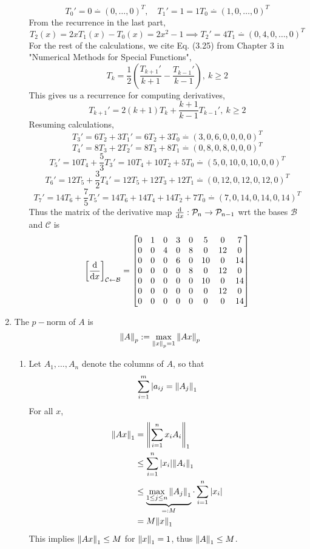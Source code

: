 \documentclass{article}
\def\mc#1{\mathcal{#1}}
\newcommand{\br}[1]{\left(#1\right)}
\newcommand{\sbr}[1]{\left[#1\right]}
\newcommand{\m}[2][b]{\begin{#1matrix}#2\end{#1matrix}}
\newcommand{\imp}{\implies}
\newcommand{\rep}{\overset{.}{=}}
\begin{document}
\begin{enumerate}
\begin{enumerate}
		\[T_0' = 0 \rep (0,\dots,0)^T,
		\quad T_1' = 1 = 1T_0 \rep (1,0,\dots,0)^T\]
		From the recurrence in the last part,
		\[T_2(x) = 2xT_1(x) - T_0(x) = 2x^2 - 1
		\imp T_2' = 4T_1 \rep (0,4,0,\dots,0)^T\]
		For the rest of the calculations, we cite Eq. (3.25) from Chapter 3 in "Numerical Methods for Special Functions",
		\[T_k = \frac12\br{\frac{T_{k+1}'}{k+1}-\frac{T_{k-1}'}{k-1}}, ~k\ge 2\]
		This gives us a recurrence for computing derivatives,
		\[T_{k+1}' = 2(k+1)T_k + \frac{k+1}{k-1}T_{k-1}', ~k\ge 2\]
		Resuming calculations,
		\[T_3' = 6T_2 + 3T_1' = 6T_2 + 3T_0 \rep (3,0,6,0,0,0,0)^T\]
		\[T_4' = 8T_3 + 2T_2' = 8T_3 + 8T_1 \rep (0,8,0,8,0,0,0)^T\]
		\[T_5' = 10T_4 + \frac53T_3' = 10T_4 + 10T_2 + 5T_0 \rep (5,0,10,0,10,0,0)^T\]
		\[T_6' = 12T_5 + \frac32T_4' = 12T_5 + 12T_3 + 12T_1 \rep (0,12,0,12,0,12,0)^T\]
		\[T_7' = 14T_6 + \frac75T_5' = 14T_6 + 14T_4 + 14T_2 + 7T_0 \rep (7,0,14,0,14,0,14)^T\]
		Thus the matrix of the derivative map $\dv{x}:\mc P_n\to\mc P_{n-1}$ wrt the bases $\mc B$ and $\mc C$ is
		\[\sbr{\dv{x}}_{\mc C\leftarrow\mc B} = 
		\m{
		0 & 1 & 0 & 3 & 0 & 5 & 0 & 7 \\
		0 & 0 & 4 & 0 & 8 & 0 & 12 & 0 \\
		0 & 0 & 0 & 6 & 0 & 10 & 0 & 14 \\
		0 & 0 & 0 & 0 & 8 & 0 & 12 & 0 \\
		0 & 0 & 0 & 0 & 0 & 10 & 0 & 14 \\
		0 & 0 & 0 & 0 & 0 & 0 & 12 & 0 \\
		0 & 0 & 0 & 0 & 0 & 0 & 0 & 14
		}\]
		
		
	\end{enumerate}



	\item The $p-$norm of $A$ is
	\[\norm{A}_p := \max_{\norm{x}_p=1}\norm{Ax}_p\]
	
	\begin{enumerate}
		
		
		
		\item Let $A_1,\dots,A_n$ denote the columns of $A$, so that
		\[\sum_{i=1}^m |a_{ij} = \norm{A_j}_1\]
		For all $x$,
		\begin{align*}
			\norm{Ax}_1 &= \norm{\sum_{i=1}^n x_iA_i}_1 \\
			&\le \sum_{i=1}^n |x_i|\norm{A_i}_1 \\
			&\le \underbrace{\max_{1\le j\le n}\norm{A_j}_1}_{=:M} \cdot \sum_{i=1}^n |x_i| \\
			&= M\norm{x}_1
		\end{align*}
		This implies $\norm{Ax}_1\le M$ for $\norm{x}_1=1$, thus $\norm{A}_1\le M$.
		

\end{enumerate}
\end{enumerate}
\end{document}
